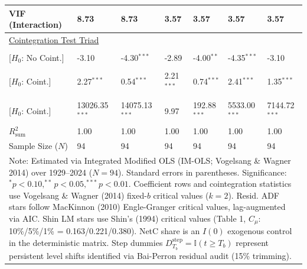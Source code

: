 \begin{table}[H]
\begin{tabular}{p{3.8cm}p{2.1cm}p{2.1cm}p{2.1cm}p{2.1cm}p{2.1cm}p{2.1cm}}
VIF (Interaction) & 8.73 & 8.73 & 3.57 & 3.57 & 3.57 & 3.57  \\
\midrule
\multicolumn{7}{l}{\underline{Cointegration Test Triad}} \\
\makecell[l]{Resid. ADF ($t_{\text{ADF}}$) \\ {\scriptsize [$H_0$: No Coint.]}} & -3.10 & -4.30$^{***}$ & -2.89 & -4.00$^{**}$ & -4.35$^{***}$ & -3.10  \\
\makecell[l]{Shin LM ($C_{\text{Shin}}$) \\ {\scriptsize [$H_0$: Coint.]}} & 2.27$^{***}$ & 0.54$^{***}$ & 2.21$^{***}$ & 0.74$^{***}$ & 2.41$^{***}$ & 1.35$^{***}$  \\
\makecell[l]{VW Type 2 ($S_{\text{Type 2}}$) \\ {\scriptsize [$H_0$: Coint.]}} & 13026.35$^{***}$ & 14075.13$^{***}$ & 9.97 & 192.88$^{***}$ & 5533.00$^{***}$ & 7144.72$^{***}$  \\
\midrule
$R^2_{\text{sum}}$ & 1.00 & 1.00 & 1.00 & 1.00 & 1.00 & 1.00  \\
Sample Size ($N$) & 94 & 94 & 94 & 94 & 94 & 94  \\
\bottomrule
\multicolumn{7}{p{16.5cm}}{\footnotesize Note: Estimated via Integrated Modified OLS (IM-OLS; Vogelsang \& Wagner 2014) over 1929--2024 ($N=94$). Standard errors in parentheses. Significance: $^*p<0.10, ^{**}p<0.05, ^{***}p<0.01$. Coefficient rows and cointegration statistics use Vogelsang \& Wagner (2014) fixed-$b$ critical values ($k=2$). Resid. ADF stars follow MacKinnon (2010) Engle-Granger critical values, lag-augmented via AIC. Shin LM stars use Shin's (1994) critical values (Table 1, $C_\mu$: 10\%/5\%/1\% = 0.163/0.221/0.380). NetC share is an $I(0)$ exogenous control in the deterministic matrix. Step dummies $D^{\text{step}}_{T_b} = \mathbb{I}(t \ge T_b)$ represent persistent level shifts identified via Bai-Perron residual audit (15\% trimming).}
\end{tabular}
\end{table}
